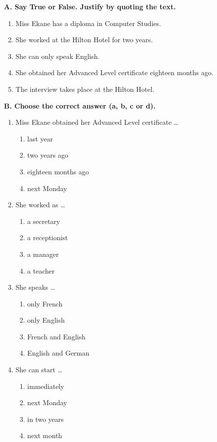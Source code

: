 \documentclass[11pt]{article}
\begin{document}
\begin{exoresolu}
\textbf{A. Say True or False. Justify by quoting the text.}
\begin{enumerate}
\item Miss Ekane has a diploma in Computer Studies.
\item She worked at the Hilton Hotel for two years.
\item She can only speak English.
\item She obtained her Advanced Level certificate eighteen months ago.
\item The interview takes place at the Hilton Hotel.
\end{enumerate}

\textbf{B. Choose the correct answer (a, b, c or d).}
\begin{enumerate}
\item Miss Ekane obtained her Advanced Level certificate \dots{}
  \begin{enumerate}
  \item last year \item two years ago \item eighteen months ago \item next Monday
  \end{enumerate}
\item She worked as \dots{}
  \begin{enumerate}
  \item a secretary \item a receptionist \item a manager \item a teacher
  \end{enumerate}
\item She speaks \dots{}
  \begin{enumerate}
  \item only French \item only English \item French and English \item English and German
  \end{enumerate}
\item She can start \dots{}
  \begin{enumerate}
  \item immediately \item next Monday \item in two years \item next month
  \end{enumerate}

\end{enumerate}
\end{exoresolu}
\end{document}
